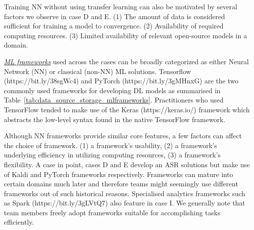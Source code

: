 Training NN without using transfer learning can also be motivated by several factors we observe in case D and E. (1) The amount of data is considered sufficient for training a model to convergence. (2) Availability of required computing resources. (3) Limited availability of relevant open-source models in a domain. %

\underline{\emph{ML frameworks}}
used across the cases can be broadly categorized as either Neural Network (NN) or classical (non-NN) ML solutions. Tensorflow (https://bit.ly/38sgWc4) and PyTorch (https://bit.ly/3gMHnxG) are the two commonly used frameworks for developing DL models as summarised in Table~\ref{tab:data_source_storage_mlframeworks}. Practitioners who used TensorFlow tended to make use of the Keras (https://keras.io/) framework which abstracts the low-level syntax found in the native TensorFlow framework.

Although NN frameworks provide similar core features, a few factors can affect the choice of framework. (1) a framework's usability, (2) a framework's underlying efficiency in utilizing computing resources, (3) a framework's flexibility. A case in point, cases D and E develop an ASR solutions but make use of Kaldi and PyTorch frameworks respectively. %
Frameworks can mature into certain domains much later and therefore teams might seemingly use different frameworks out of such historical reasons. %
Specialised analytics frameworks such as Spark (https://bit.ly/3gLVtQ7) also feature in case I. We generally note that team members freely adopt frameworks suitable for accomplishing tasks efficiently. %

